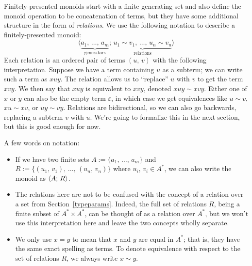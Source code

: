 \documentclass[../generics]{subfiles}
\begin{document}
Finitely-presented monoids start with a finite generating set and also define the monoid operation to be concatenation of terms, but they have some additional structure in the form of \emph{relations}. We use the following notation to describe a finitely-presented monoid:
\[\langle \underbrace{a_1,\,\ldots,\, a_m}_{\text{generators}};\, \underbrace{u_1 \sim v_1,\,\ldots,\, u_n \sim v_n}_{\text{relations}}\rangle\]
Each relation is an ordered pair of terms $(u,\,v)$ with the following interpretation. Suppose we have a term containing $u$ as a subterm; we can write such a term as $xuy$. The relation allows us to ``replace'' $u$ with $v$ to get the term $xvy$. We then say that $xuy$ is equivalent to $xvy$, denoted $xuy\sim xvy$. Either one of $x$ or $y$ can also be the empty term $\varepsilon$, in which case we get equivalences like $u\sim v$, $xu\sim xv$, or $uy\sim vy$. Relations are bidirectional, so we can also go backwards, replacing a subterm $v$ with $u$. We're going to formalize this in the next section, but this is good enough for now.

A few words on notation:
\begin{itemize}
\item If we have two finite sets $A := \{a_1,\,\ldots,\, a_m\}$ and $R := \{(u_1,\,v_1),\,\ldots,\,(u_n,\,v_n)\}$ where $u_i$, $v_i\in A^*$, we can also write the monoid as $\langle A;\,R\rangle$.
\item The relations here are not to be confused with the concept of a relation over a set from Section~\ref{typeparams}. Indeed, the full set of relations $R$, being a finite subset of $A^*\times A^*$, can be thought of as a relation over $A^*$, but we won't use this interpretation here and leave the two concepts wholly separate.
\item We only use $x=y$ to mean that $x$ and $y$ are equal in $A^*$; that is, they have the same exact spelling as terms. To denote equivalence with respect to the set of relations $R$, we always write $x\sim y$.
\end{itemize}
\end{document}
